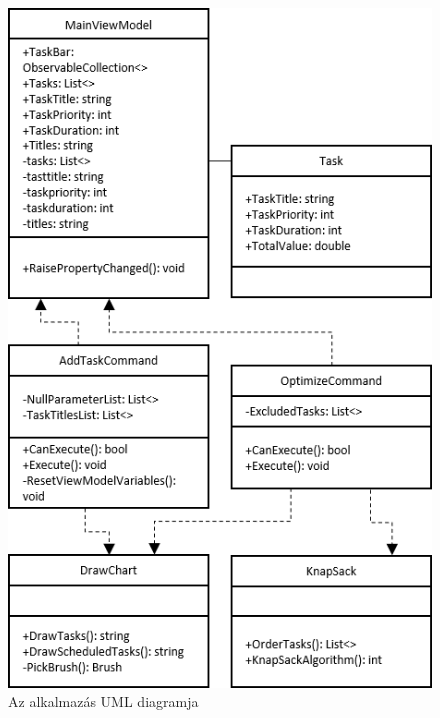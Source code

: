\begin{figure}[h]
	\centering
	\includegraphics[scale=1.3]{images/uml.png}
	\caption{Az alkalmazás UML diagramja}
\end{figure}
